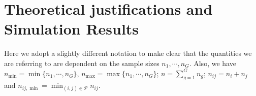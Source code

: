 \documentclass[times,sort&compress,3p]{elsarticle}
\theoremstyle{plain}%
\theoremstyle{definition}
\def\log{\hbox{log}}
\def\log{\hbox{log}}
\def\trans{^{\rm T}}
\newcommand{\uF}       {\mbox{\boldmath$F$}}
\newcommand{\uS}       {\mbox{\boldmath$S$}}
\newcommand{\uX}       {\mbox{\boldmath$X$}}
\begin{document}

\section{Theoretical justifications and Simulation Results} \label{sec:theori}
Here we adopt a slightly different notation to make clear that the quantities we are referring to are dependent on the sample sizes $n_1, \cdots, n_{G}$. Also, we have $n_{\min} = \min\{n_1,\cdots, n_{G}\}$, $n_{\max} = \max\{n_1,\cdots, n_{G}\}$; $n = \sum^{G}_{g=1}n_g$; $n_{ij} = n_i + n_j$ and $n_{ij,\min} = \min_{(i,j) \in \mathcal{P}} n_{ij}$. 
\end{document}

